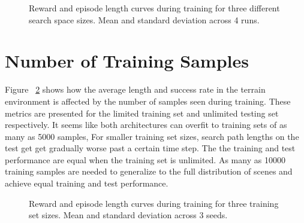 \begin{figure}
    \centering
    
    
    
    \label{fig:shape}
    \caption[Search space size learning curve.]{Reward and episode length curves during training for three different search space sizes. Mean and standard deviation across 4 runs.}
\end{figure}

\section{Number of Training Samples}

Figure ~\ref{fig:sample} shows how the average length and success rate in the terrain environment is affected by the number of samples seen during training.
These metrics are presented for the limited training set and unlimited testing set respectively.
It seems like both architectures can overfit to training sets of as many as 5000 samples,
For smaller training set sizes, search path lengths on the test get get gradually worse past a certain time step.
The the training and test performance are equal when the training set is unlimited.
As many as 10000 training samples are needed to generalize to the full distribution of scenes and achieve equal training and test performance. 

\begin{figure}
    \centering
    
    
    
    \label{fig:sample}
    \caption[Generalization results.]{Reward and episode length curves during training for three training set sizes. Mean and standard deviation across 3 seeds.}
\end{figure}
